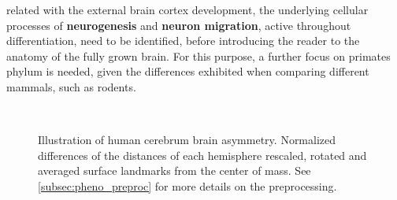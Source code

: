 related with the external brain cortex development, the underlying cellular processes of \textbf{neurogenesis} and  \textbf{neuron migration}, active throughout differentiation, need to be identified, before introducing the reader to the anatomy of the fully grown brain. For this purpose, a further focus on primates phylum is needed, given the differences exhibited when comparing different mammals, such as rodents\cite{Molnar2019}.


\begin{figure}[H]
	\centering
	\\
	\caption[Human cerebrum brain asymmetry]{Illustration of human cerebrum brain asymmetry. Normalized differences of the distances of each hemisphere rescaled, rotated and averaged surface landmarks from the center of mass. See \autoref{subsec:pheno_preproc} for more details on the preprocessing.}
	\label{fig:brainlat}
\end{figure}

